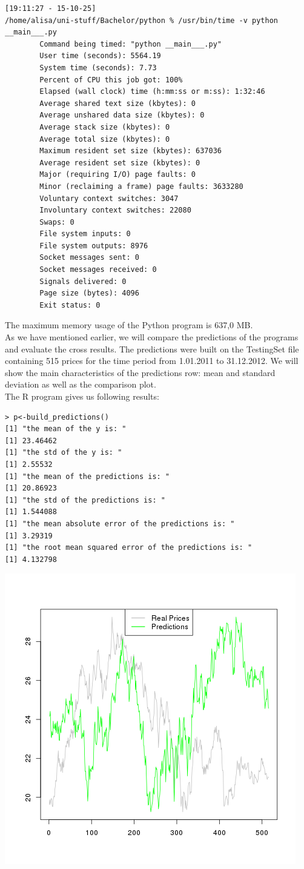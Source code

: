\documentclass[
  twoside,
  12pt, a4paper,
  footinclude=true,
  headinclude=true,
  cleardoublepage=empty
]{article}
\begin{document}
\begin{verbatim}
[19:11:27 - 15-10-25] 
/home/alisa/uni-stuff/Bachelor/python % /usr/bin/time -v python __main___.py
        Command being timed: "python __main___.py"
        User time (seconds): 5564.19
        System time (seconds): 7.73
        Percent of CPU this job got: 100%
        Elapsed (wall clock) time (h:mm:ss or m:ss): 1:32:46
        Average shared text size (kbytes): 0
        Average unshared data size (kbytes): 0
        Average stack size (kbytes): 0
        Average total size (kbytes): 0
        Maximum resident set size (kbytes): 637036
        Average resident set size (kbytes): 0
        Major (requiring I/O) page faults: 0
        Minor (reclaiming a frame) page faults: 3633280
        Voluntary context switches: 3047
        Involuntary context switches: 22080
        Swaps: 0
        File system inputs: 0
        File system outputs: 8976
        Socket messages sent: 0
        Socket messages received: 0
        Signals delivered: 0
        Page size (bytes): 4096
        Exit status: 0
\end{verbatim}
The maximum memory usage of the Python program is 637,0 MB.\\
As we have mentioned earlier, we will compare the predictions of the programs and evaluate the cross results. The predictions were built on the TestingSet file containing 515 prices for the time period from 1.01.2011 to 31.12.2012. We will show the main characteristics of the predictions row: mean and standard deviation as well as the comparison plot.\\
The R program gives us following results:
\begin{verbatim}
> p<-build_predictions()
[1] "the mean of the y is: "
[1] 23.46462
[1] "the std of the y is: "
[1] 2.55532
[1] "the mean of the predictions is: "
[1] 20.86923
[1] "the std of the predictions is: "
[1] 1.544088
[1] "the mean absolute error of the predictions is: "
[1] 3.29319
[1] "the root mean squared error of the predictions is: "
[1] 4.132798
\end{verbatim}
\includegraphics[scale=0.75]{RPredicitions.png}
\end{document}

